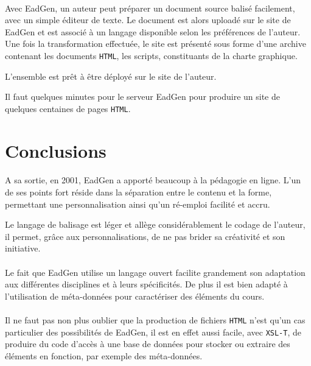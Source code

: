 \paragraph{}Avec EadGen, un auteur peut préparer un document source balisé facilement, avec un simple éditeur de texte. Le document est alors uploadé sur le site de EadGen et est associé à un langage disponible selon les préférences de l'auteur. Une fois la transformation effectuée, le site est présenté sous forme d'une archive contenant les documents \texttt{HTML}, les scripts, constituants de la charte graphique. 

L'ensemble est prêt à être déployé sur le site de l'auteur.

Il faut quelques minutes pour le serveur EadGen pour produire un site de quelques centaines de pages \texttt{HTML}.





\section{Conclusions}


\paragraph{}A sa sortie, en 2001, EadGen a apporté beaucoup à la pédagogie en ligne. L'un de ses points fort réside dans la séparation entre le contenu et la forme, permettant une personnalisation ainsi qu'un ré-emploi facilité et accru.


Le langage de balisage est léger et allège considérablement le codage de l'auteur, il permet, grâce aux personnalisations, de ne pas brider sa créativité et son initiative.


\paragraph{}Le fait que EadGen utilise un langage ouvert facilite grandement son adaptation aux différentes disciplines et à leurs spécificités. De plus il est bien adapté à l'utilisation de méta-données pour caractériser des éléments du cours. 


\paragraph{}Il ne faut pas non plus oublier que la production de fichiers \texttt{HTML} n'est qu'un cas particulier des possibilités de EadGen, il est en effet aussi facile, avec \texttt{XSL-T}, de produire du code d'accès à une base de données pour stocker ou extraire des éléments en fonction, par exemple des méta-données.